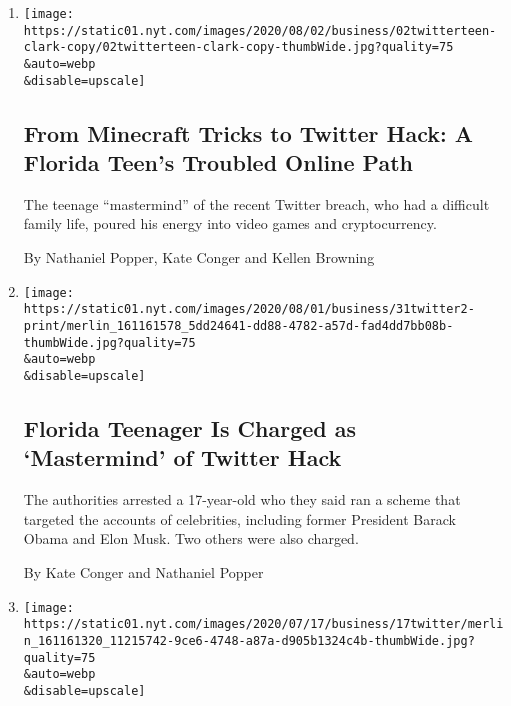\begin{enumerate}
\def\labelenumi{\arabic{enumi}.}
\item
  \href{/2020/08/02/technology/florida-teenager-twitter-hack.html}{}

  \texttt{[image: https://static01.nyt.com/images/2020/08/02/business/02twitterteen-clark-copy/02twitterteen-clark-copy-thumbWide.jpg?quality=75\\\&auto=webp\\\&disable=upscale]}

  \hypertarget{from-minecraft-tricks-to-twitter-hack-a-florida-teens-troubled-online-path}{%
  \subsection{From Minecraft Tricks to Twitter Hack: A Florida Teen's
  Troubled Online
  Path}\label{from-minecraft-tricks-to-twitter-hack-a-florida-teens-troubled-online-path}}

  The teenage ``mastermind'' of the recent Twitter breach, who had a
  difficult family life, poured his energy into video games and
  cryptocurrency.

  By Nathaniel Popper, Kate Conger and Kellen Browning
\item
  \href{/2020/07/31/technology/twitter-hack-arrest.html}{}

  \texttt{[image: https://static01.nyt.com/images/2020/08/01/business/31twitter2-print/merlin\_161161578\_5dd24641-dd88-4782-a57d-fad4dd7bb08b-thumbWide.jpg?quality=75\\\&auto=webp\\\&disable=upscale]}

  \hypertarget{florida-teenager-is-charged-as-mastermind-of-twitter-hack}{%
  \subsection{Florida Teenager Is Charged as `Mastermind' of Twitter
  Hack}\label{florida-teenager-is-charged-as-mastermind-of-twitter-hack}}

  The authorities arrested a 17-year-old who they said ran a scheme that
  targeted the accounts of celebrities, including former President
  Barack Obama and Elon Musk. Two others were also charged.

  By Kate Conger and Nathaniel Popper
\item
  \href{/2020/07/17/technology/twitter-hackers-interview.html}{}

  \texttt{[image: https://static01.nyt.com/images/2020/07/17/business/17twitter/merlin\_161161320\_11215742-9ce6-4748-a87a-d905b1324c4b-thumbWide.jpg?quality=75\\\&auto=webp\\\&disable=upscale]}


\end{enumerate}
